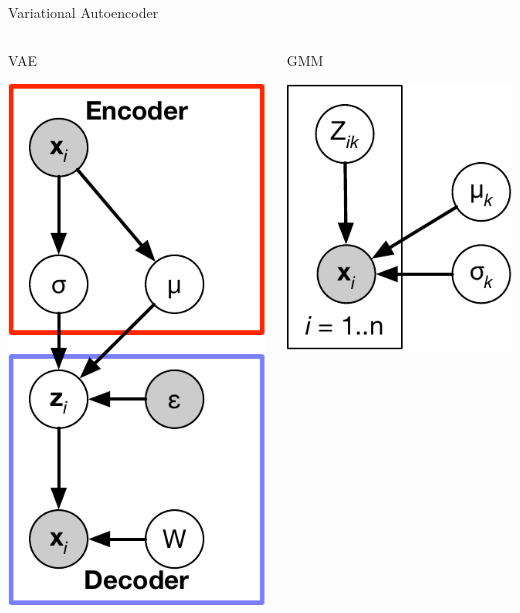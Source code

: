 \documentclass[
  ignorenonframetext,
  aspectratio=169]{beamer}
\begin{document}
\begin{frame}{Variational Autoencoder}
\protect\hypertarget{variational-autoencoder}{}
\begin{columns}[T]
\begin{column}{.45\textwidth}
VAE

\scriptsize

\begin{center}\includegraphics[width=.5\linewidth]{./Vis/unsupervised/VAE_graphical_model} \end{center}

\normalsize
\end{column}

\begin{column}{.45\textwidth}
GMM

\scriptsize

\begin{center}\includegraphics[width=.45\linewidth]{./Vis/unsupervised/GMM_graphical_model} \end{center}


\end{column}
\end{columns}
\end{frame}
\end{document}
